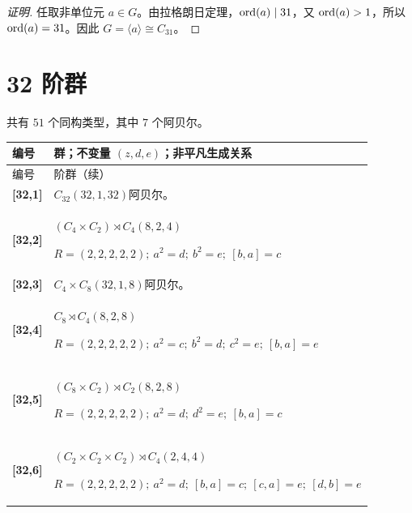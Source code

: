 \documentclass[UTF8,fontset=fandol,11pt,a4paper]{ctexart}
\begin{document}
\begin{proof}[证明]
任取非单位元 $a\in G$。由拉格朗日定理，$\operatorname{ord}(a)\mid 31$，又 $\operatorname{ord}(a)>1$，所以 $\operatorname{ord}(a)=31$。因此 $G=\langle a\rangle\cong C_{31}$。
\end{proof}

\section*{32 阶群}\label{order:32}

共有 $51$ 个同构类型，其中 $7$ 个阿贝尔。

\begingroup\small\setlength{\tabcolsep}{3pt}\renewcommand{\arraystretch}{1.12}

\begin{longtable}{@{}p{17mm}>{\raggedright\arraybackslash}p{141mm}@{}}

\toprule 编号 & 群；不变量 $(z,d,e)$；非平凡生成关系\\\midrule\endfirsthead

\toprule 编号 & 32 阶群（续）\\\midrule\endhead\bottomrule\endfoot

\textbf{[32,1]} & $C_{32}$\quad $(32,1,32)$\quad 阿贝尔。\\[3pt]

\textbf{[32,2]} & $(C_{4}\times C_{2})\rtimes C_{4}$\quad $(8,2,4)$\par\(R=(2,2,2,2,2);\allowbreak\ a^{2}=d;\allowbreak\ b^{2}=e;\allowbreak\ [b,a]=c\)\\[3pt]

\textbf{[32,3]} & $C_{4}\times C_{8}$\quad $(32,1,8)$\quad 阿贝尔。\\[3pt]

\textbf{[32,4]} & $C_{8}\rtimes C_{4}$\quad $(8,2,8)$\par\(R=(2,2,2,2,2);\allowbreak\ a^{2}=c;\allowbreak\ b^{2}=d;\allowbreak\ c^{2}=e;\allowbreak\ [b,a]=e\)\\[3pt]

\textbf{[32,5]} & $(C_{8}\times C_{2})\rtimes C_{2}$\quad $(8,2,8)$\par\(R=(2,2,2,2,2);\allowbreak\ a^{2}=d;\allowbreak\ d^{2}=e;\allowbreak\ [b,a]=c\)\\[3pt]

\textbf{[32,6]} & $(C_{2}\times C_{2}\times C_{2})\rtimes C_{4}$\quad $(2,4,4)$\par\(R=(2,2,2,2,2);\allowbreak\ a^{2}=d;\allowbreak\ [b,a]=c;\allowbreak\ [c,a]=e;\allowbreak\ [d,b]=e\)\\[3pt]


\end{longtable}
\end{document}
